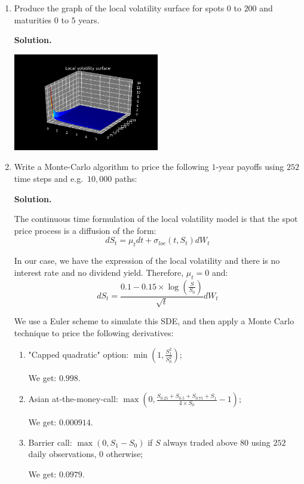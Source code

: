 \documentclass[12pt]{article}
\newenvironment{solution}{\vspace{0.2cm} \textbf{Solution.}}{}
\begin{document}
	\begin{enumerate}[label=(\alph*)]
		
		\item Produce the graph of the local volatility surface for spots $0$ to $200$ and maturities $0$ to $5$ years.
		
		\begin{solution}
			
			\begin{center}
				\includegraphics[width=0.5\textwidth]{local_vol}
			\end{center}
			
		\end{solution}
		
		\item Write a Monte-Carlo algorithm to price the following $1$-year payoffs using $252$ time steps and e.g.\ $10,000$ paths:
		
		\begin{solution}
			
			The continuous time formulation of the local volatility model is that the spot price process is a diffusion of the form:
			$$ dS_t = \mu_t dt + \sigma_{loc} (t,S_t) dW_t$$
			
			In our case, we have the expression of the local volatility and there is no interest rate and no dividend yield. Therefore, $\mu_t = 0$ and:
			$$ dS_t =  \frac{0.1 - 0.15 \times \log\left(\frac{S}{S_0}\right)}{\sqrt{t}} dW_t$$
			
			We use a Euler scheme to simulate this SDE, and then apply a Monte Carlo technique to price the following derivatives:
			
			\begin{enumerate}[label=(\roman*)]
	
				\item "Capped quadratic" option: $\min\left(1,\frac{S_1^2}{S_0^2}\right)$;
								
				We get: $0.998$.
				
				\item Asian at-the-money-call: $\max\left(0, \frac{S_{0.25} + S_{0.5} + S_{0.75} + S_1}{4 \times S_0} - 1\right)$;
				
				We get: $0.000914$.
				
				\item Barrier call: $\max(0, S_1 - S_0)$ if $S$ always traded above $80$ using $252$ daily observations, 0 otherwise;
				
				We get: $0.0979$.
				
			\end{enumerate}
			
		\end{solution}
		
	\end{enumerate}
\end{document}
